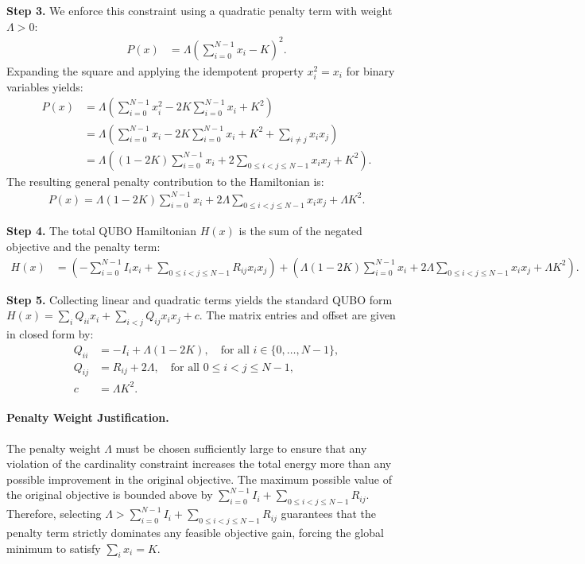 \documentclass[12pt]{article}
\begin{document}
\textbf{Step 3.} We enforce this constraint using a quadratic penalty term with weight $\Lambda > 0$:
\begin{align}
P(x) &= \Lambda \left( \sum_{i=0}^{N-1} x_i - K \right)^2. \tag{a}
\end{align}
Expanding the square and applying the idempotent property $x_i^2 = x_i$ for binary variables yields:
\begin{align}
P(x) &= \Lambda \left( \sum_{i=0}^{N-1} x_i^2 - 2K \sum_{i=0}^{N-1} x_i + K^2 \right) \nonumber \\
&= \Lambda \left( \sum_{i=0}^{N-1} x_i - 2K \sum_{i=0}^{N-1} x_i + K^2 + \sum_{i \neq j} x_i x_j \right) \nonumber \\
&= \Lambda \left( (1 - 2K) \sum_{i=0}^{N-1} x_i + 2 \sum_{0 \leq i < j \leq N-1} x_i x_j + K^2 \right). \tag{b}
\end{align}
The resulting general penalty contribution to the Hamiltonian is:
\begin{align}
P(x) = \Lambda(1 - 2K) \sum_{i=0}^{N-1} x_i + 2\Lambda \sum_{0 \leq i < j \leq N-1} x_i x_j + \Lambda K^2. \tag{c}
\end{align}

\textbf{Step 4.} The total QUBO Hamiltonian $H(x)$ is the sum of the negated objective and the penalty term:
\begin{align}
H(x) &= \left( -\sum_{i=0}^{N-1} I_i x_i + \sum_{0 \leq i < j \leq N-1} R_{ij} x_i x_j \right) + \left( \Lambda(1 - 2K) \sum_{i=0}^{N-1} x_i + 2\Lambda \sum_{0 \leq i < j \leq N-1} x_i x_j + \Lambda K^2 \right).
\end{align}

\textbf{Step 5.} Collecting linear and quadratic terms yields the standard QUBO form $H(x) = \sum_{i} Q_{ii} x_i + \sum_{i < j} Q_{ij} x_i x_j + c$. The matrix entries and offset are given in closed form by:
\begin{align}
Q_{ii} &= -I_i + \Lambda(1 - 2K), \quad \text{for all } i \in \{0, \dots, N-1\}, \\
Q_{ij} &= R_{ij} + 2\Lambda, \quad \text{for all } 0 \leq i < j \leq N-1, \\
c &= \Lambda K^2.
\end{align}

\paragraph{Penalty Weight Justification.}
The penalty weight $\Lambda$ must be chosen sufficiently large to ensure that any violation of the cardinality constraint increases the total energy more than any possible improvement in the original objective. The maximum possible value of the original objective is bounded above by $\sum_{i=0}^{N-1} I_i + \sum_{0 \leq i < j \leq N-1} R_{ij}$. Therefore, selecting $\Lambda > \sum_{i=0}^{N-1} I_i + \sum_{0 \leq i < j \leq N-1} R_{ij}$ guarantees that the penalty term strictly dominates any feasible objective gain, forcing the global minimum to satisfy $\sum_i x_i = K$.
\end{document}

